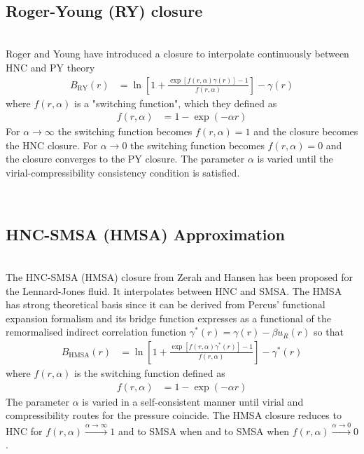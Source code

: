 ~\\
\subsection{Roger-Young (RY) closure}
~\\

Roger and Young have introduced a closure to interpolate continuously between HNC and PY
theory \cite{Rogers1984}
\begin{align}
B_\text{RY}(r) &= \ln
\left[1+\frac{\exp\left[f(r,\alpha)\gamma(r)\right]-1}{f(r,\alpha)}\right]-\gamma(r)
\end{align}
where $f(r,\alpha)$ is a "switching function", which they defined as
\begin{align}
f(r,\alpha) &= 1- \exp(-\alpha r)
\end{align}
For $\alpha \rightarrow \infty$ the switching function becomes $f(r,\alpha)=1$ and the
closure becomes the HNC closure.
For $\alpha \rightarrow 0$ the switching function becomes $f(r,\alpha)=0$ and the
closure converges to the PY closure. The parameter $\alpha$ is varied until the
virial-compressibility consistency condition is satisfied.

~\\
\subsection{HNC-SMSA (HMSA) Approximation}
~\\

The HNC\hbox{-}SMSA (HMSA) closure from Zerah and Hansen  \cite{Zerah1986} has been proposed
for the Lennard-Jones fluid. It interpolates between HNC and SMSA. The HMSA has
strong theoretical basis since it can be derived from Percus’ functional expansion
formalism and its bridge function expresses as a functional of the remormalised
indirect correlation function $\gamma^*(r)=\gamma(r)-\beta u_{R}(r)$ so that
\begin{align}
B_\text{HMSA}(r) &= \ln
\left[1+\frac{\exp\left[f(r,\alpha)\gamma^*(r)\right]-1}{f(r,\alpha)}\right]-\gamma^*(r)
\end{align}
where $f(r,\alpha)$ is the switching function defined as
\begin{align}
f(r,\alpha) &= 1-\exp(-\alpha r)
\end{align}
The parameter $\alpha$ is varied in a self-consistent manner until virial and
compressibility routes for the pressure coincide.
The HMSA closure reduces to HNC for $f(r,\alpha) \xrightarrow{\alpha\rightarrow\infty} 1$ and to SMSA when
and to SMSA when $f(r,\alpha) \xrightarrow{\alpha\rightarrow 0} 0$.

